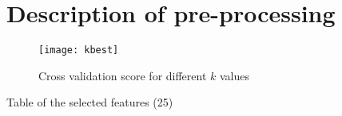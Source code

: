
\section{Description of pre-processing}%
\label{sec:desc-prep}

\begin{figure}[H]
    \centering
    \texttt{[image: kbest]}
    \caption{Cross validation score for different $k$ values}%
    \label{fig:feature_cross}
\end{figure}

\begin{table}[H]
    \centering
    \caption{Table of the selected features (25)}%
    \label{tab:features}
    
\end{table}